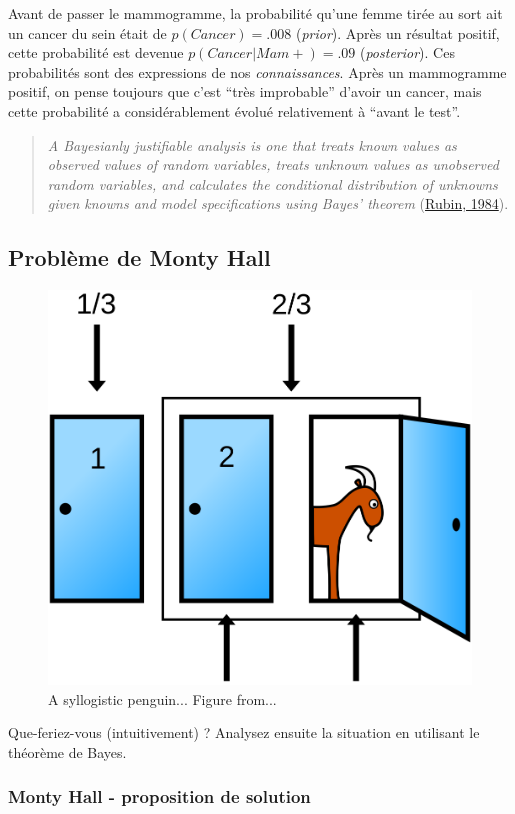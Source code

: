 \documentclass[
  a4paper,11pt,twoside,onecolumn,openright,final,oldfontcommands]{memoir}
\theoremstyle{definition}
\theoremstyle{definition}
\theoremstyle{definition}
\theoremstyle{definition}
\theoremstyle{remark}
\begin{document}
Avant de passer le mammogramme, la probabilité qu'une femme tirée au sort ait un cancer du sein était de \(p(Cancer)=.008\) (\emph{prior}). Après un résultat positif, cette probabilité est devenue \(p(Cancer|Mam+)=.09\) (\emph{posterior}). Ces probabilités sont des expressions de nos \emph{connaissances}. Après un mammogramme positif, on pense toujours que c'est ``très improbable'' d'avoir un cancer, mais cette probabilité a considérablement évolué relativement à ``avant le test''.

\begin{quote}
\emph{A Bayesianly justifiable analysis is one that treats known values as observed values of random variables, treats unknown values as unobserved random variables, and calculates the conditional distribution of unknowns given knowns and model specifications using Bayes' theorem} (\href{https://projecteuclid.org/euclid.aos/1176346785}{Rubin, 1984}).
\end{quote}

\hypertarget{probluxe8me-de-monty-hall}{%
\subsection{Problème de Monty Hall}\label{probluxe8me-de-monty-hall}}

\begin{figure}[!htb]

{\centering \includegraphics[width=0.5\linewidth]{figures/monty1} 

}

\caption{A syllogistic penguin... Figure from...}\label{fig:monty1}
\end{figure}

Que-feriez-vous (intuitivement) ? Analysez ensuite la situation en utilisant le théorème de Bayes.

\hypertarget{monty-hall---proposition-de-solution}{%
\subsubsection{Monty Hall - proposition de solution}\label{monty-hall---proposition-de-solution}}
\end{document}
